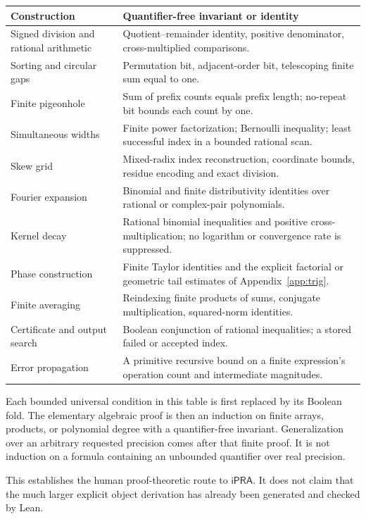 \documentclass[11pt]{article}
\theoremstyle{definition}\newtheorem{definition}[theorem]{Definition}
\theoremstyle{remark}\newtheorem{remark}[theorem]{Remark}
\newcommand{\ipra}{\mathsf{iPRA}}\newcommand{\HA}{\mathsf{HA}}
\begin{document}
\begin{longtable}{>{\raggedright\arraybackslash}p{}>{\raggedright\arraybackslash}p{}}
\toprule
Construction & Quantifier-free invariant or identity\\
\midrule\endhead
Signed division and rational arithmetic & Quotient--remainder identity, positive denominator, cross-multiplied comparisons.\\
Sorting and circular gaps & Permutation bit, adjacent-order bit, telescoping finite sum equal to one.\\
Finite pigeonhole & Sum of prefix counts equals prefix length; no-repeat bit bounds each count by one.\\
Simultaneous widths & Finite power factorization; Bernoulli inequality; least successful index in a bounded rational scan.\\
Skew grid & Mixed-radix index reconstruction, coordinate bounds, residue encoding and exact division.\\
Fourier expansion & Binomial and finite distributivity identities over rational or complex-pair polynomials.\\
Kernel decay & Rational binomial inequalities and positive cross-multiplication; no logarithm or convergence rate is suppressed.\\
Phase construction & Finite Taylor identities and the explicit factorial or geometric tail estimates of Appendix~\ref{app:trig}.\\
Finite averaging & Reindexing finite products of sums, conjugate multiplication, squared-norm identities.\\
Certificate and output search & Boolean conjunction of rational inequalities; a stored failed or accepted index.\\
Error propagation & A primitive recursive bound on a finite expression's operation count and intermediate magnitudes.\\
\bottomrule
\end{longtable}

Each bounded universal condition in this table is first replaced by its Boolean fold. The elementary algebraic proof is then an induction on finite arrays, products, or polynomial degree with a quantifier-free invariant. Generalization over an arbitrary requested precision comes after that finite proof. It is not induction on a formula containing an unbounded quantifier over real precision.

This establishes the human proof-theoretic route to $\ipra$. It does not claim that the much larger explicit object derivation has already been generated and checked by Lean.
\end{document}

